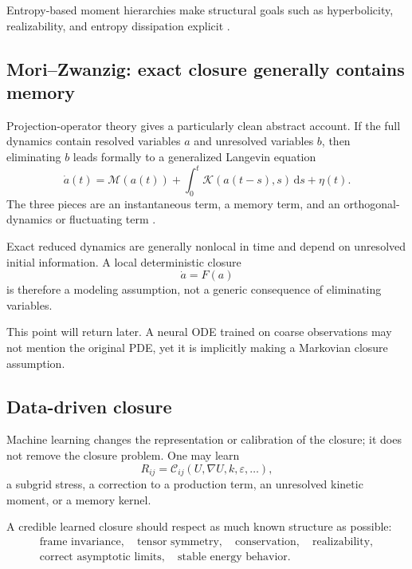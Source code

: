 \documentclass[11pt]{article}
\newcommand{\C}{\mathcal{C}}
\newcommand{\M}{\mathcal{M}}
\newcommand{\K}{\mathcal{K}}
\newcommand{\dd}{\,\mathrm{d}}
\begin{document}
Entropy-based moment hierarchies make structural goals such as hyperbolicity, realizability, and entropy dissipation explicit \citep{levermore1996moment}.

\subsection{Mori--Zwanzig: exact closure generally contains memory}

Projection-operator theory gives a particularly clean abstract account. If the full dynamics contain resolved variables \(a\) and unresolved variables \(b\), then eliminating \(b\) leads formally to a generalized Langevin equation
\begin{equation}
\dot a(t)
=\M(a(t))
+\int_0^t\K(a(t-s),s)\dd s
+\eta(t).
\end{equation}
The three pieces are an instantaneous term, a memory term, and an orthogonal-dynamics or fluctuating term \citep{mori1965transport,zwanzig1961memory}.

\begin{bigidea}
Exact reduced dynamics are generally nonlocal in time and depend on unresolved initial information. A local deterministic closure
\[
\dot a=F(a)
\]
is therefore a modeling assumption, not a generic consequence of eliminating variables.
\end{bigidea}

This point will return later. A neural ODE trained on coarse observations may not mention the original PDE, yet it is implicitly making a Markovian closure assumption.

\subsection{Data-driven closure}

Machine learning changes the representation or calibration of the closure; it does not remove the closure problem. One may learn
\[
R_{ij}=\C_{ij}(U,\nabla U,k,\varepsilon,\ldots),
\]
a subgrid stress, a correction to a production term, an unresolved kinetic moment, or a memory kernel.

A credible learned closure should respect as much known structure as possible:
\begin{equation}
\begin{gathered}
\text{frame invariance},\quad
\text{tensor symmetry},\quad
\text{conservation},\quad
\text{realizability},\\
\text{correct asymptotic limits},\quad
\text{stable energy behavior}.
\end{gathered}
\end{equation}
\end{document}
